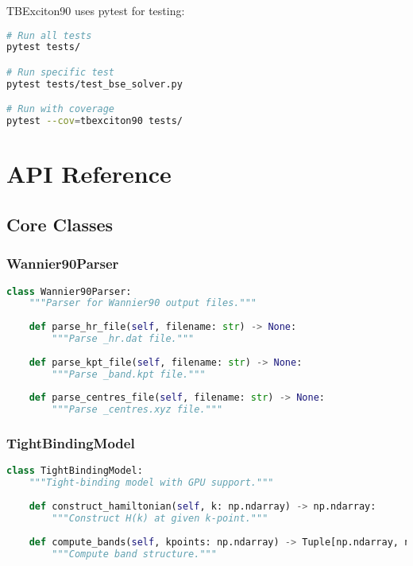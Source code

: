 \documentclass[11pt,a4paper]{article}
\begin{document}
TBExciton90 uses pytest for testing:

\begin{lstlisting}[language=bash]
# Run all tests
pytest tests/

# Run specific test
pytest tests/test_bse_solver.py

# Run with coverage
pytest --cov=tbexciton90 tests/
\end{lstlisting}

\section{API Reference}

\subsection{Core Classes}

\subsubsection{Wannier90Parser}

\begin{lstlisting}[language=Python]
class Wannier90Parser:
    """Parser for Wannier90 output files."""
    
    def parse_hr_file(self, filename: str) -> None:
        """Parse _hr.dat file."""
        
    def parse_kpt_file(self, filename: str) -> None:
        """Parse _band.kpt file."""
        
    def parse_centres_file(self, filename: str) -> None:
        """Parse _centres.xyz file."""
\end{lstlisting}

\subsubsection{TightBindingModel}

\begin{lstlisting}[language=Python]
class TightBindingModel:
    """Tight-binding model with GPU support."""
    
    def construct_hamiltonian(self, k: np.ndarray) -> np.ndarray:
        """Construct H(k) at given k-point."""
        
    def compute_bands(self, kpoints: np.ndarray) -> Tuple[np.ndarray, np.ndarray]:
        """Compute band structure."""
\end{lstlisting}
\end{document}

